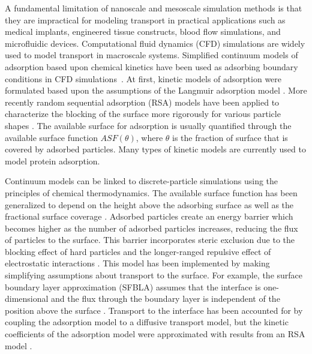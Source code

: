 A fundamental limitation of nanoscale and mesoscale simulation methods
is that they are impractical for modeling transport in practical applications
such as medical implants, engineered tissue constructs, blood flow
simulations, and microfluidic devices. Computational fluid dynamics
(CFD) simulations are widely used to model transport in macroscale
systems. Simplified continuum models of adsorption based upon chemical
kinetics have been used as adsorbing boundary conditions in CFD simulations~\cite{Jenkins2004,Glaser1993,Edwards1999}.
At first, kinetic models of adsorption were formulated based upon
the assumptions of the Langmuir adsorption model \cite{Andrade1986}.
More recently random sequential adsorption (RSA) models have been
applied to characterize the blocking of the surface more rigorously
for various particle shapes \cite{Talbot2000287}. The available surface
for adsorption is usually quantified through the available surface
function $ASF\left(\theta\right)$, where $\theta$ is the fraction
of surface that is covered by adsorbed particles. Many types of kinetic
models are currently used to model protein adsorption\cite{Rabe2010}. 

Continuum models can be linked to discrete-particle simulations using
the principles of chemical thermodynamics. The available surface function
has been generalized to depend on the height above the adsorbing surface
as well as the fractional surface coverage \cite{Adamczyk1999}. Adsorbed
particles create an energy barrier which becomes higher as the number
of adsorbed particles increases, reducing the flux of particles to
the surface. This barrier incorporates steric exclusion due to the
blocking effect of hard particles and the longer-ranged repulsive
effect of electrostatic interactions \cite{Adamczyk2000}. This model
has been implemented by making simplifying assumptions about transport
to the surface. For example, the surface boundary layer approximation
(SFBLA) assumes that the interface is one-dimensional and the flux
through the boundary layer is independent of the position above the
surface \cite{Adamczyk1999a}. Transport to the interface has been
accounted for by coupling the adsorption model to a diffusive transport
model, but the kinetic coefficients of the adsorption model were approximated
with results from an RSA model \cite{Adamczyk2000}. 

